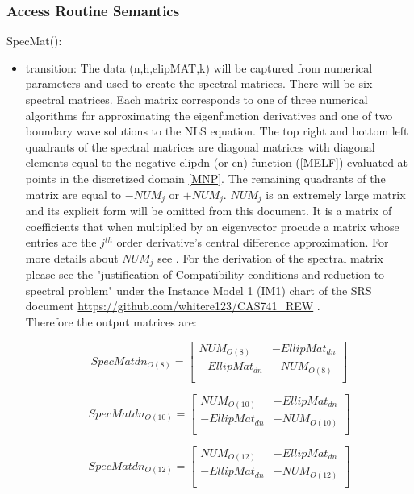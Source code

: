 \documentclass[12pt, titlepage]{article}
\begin{document}
\subsubsection{Access Routine Semantics}

\noindent
SpecMat():
\begin{itemize}
	\item transition: The data (n,h,elipMAT,k) will be captured from numerical 
	parameters and used to create the spectral matrices. There will be six 
	spectral matrices. Each matrix corresponds to one of three 
	numerical 
	algorithms for approximating the eigenfunction derivatives and one of two 
	boundary wave solutions to the NLS equation. The top right 
	and 
	bottom left quadrants of the spectral matrices are diagonal matrices with 
	diagonal  
	elements 
	equal to the negative elipdn (or cn) function (\ref{MELF}) evaluated at 
	points in 
	the 
	discretized domain \ref{MNP}. 
	The remaining quadrants of the matrix are equal to $-NUM_{j}$ or 
	$+NUM_{j}$. $NUM_{j}$ is an extremely large matrix and its explicit form 
	will be omitted from this document. It is a matrix of coefficients that 
	when multiplied by an eigenvector procude a matrix whose entries are the 
	$j^{th}$ order derivative's central difference approximation. For more 
	details about $NUM_{j}$ see 
	\cite{grasPel}. For the derivation of the spectral matrix please see the 
	"justification of Compatibility conditions and reduction to spectral 
	problem" under the Instance Model 1 (IM1) chart of the SRS document 
	\url{https://github.com/whitere123/CAS741_REW} .\\
Therefore the output matrices are: 

 \[
SpecMatdn_{O(8)}=
\left[ {\begin{array}{cc}
	NUM_{O(8)} & -EllipMat_{dn} \\
	-EllipMat_{dn} & -NUM_{O(8)} \\
	\end{array} } \right]
\] 

 \[
SpecMatdn_{O(10)}=
\left[ {\begin{array}{cc}
	NUM_{O(10)} & -EllipMat_{dn} \\
	-EllipMat_{dn} & -NUM_{O(10)} \\
	\end{array} } \right]
\] 

 \[
SpecMatdn_{O(12)}=
\left[ {\begin{array}{cc}
	NUM_{O(12)} & -EllipMat_{dn} \\
	-EllipMat_{dn} & -NUM_{O(12)} \\
	\end{array} } \right]
\] 


\end{itemize}
\end{document}
